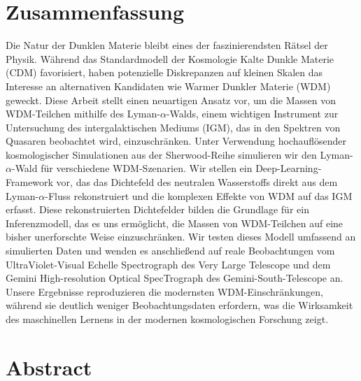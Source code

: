 \documentclass[
     12pt,                    %
     a4paper,             %
     BCOR=10mm,     %
     DIV=14,                 %
     listof=totoc,                    %
     bibliography=totoc,       %
     index=totoc,              %
     twoside,
     headsepline
     ]{scrreprt}
\begin{document}
\cleardoublepage

\section*{Zusammenfassung}

Die Natur der Dunklen Materie bleibt eines der faszinierendsten Rätsel der Physik. Während das Standardmodell der Kosmologie Kalte Dunkle Materie (CDM) favorisiert, haben potenzielle Diskrepanzen auf kleinen Skalen das Interesse an alternativen Kandidaten wie Warmer Dunkler Materie (WDM) geweckt. Diese Arbeit stellt einen neuartigen Ansatz vor, um die Massen von WDM-Teilchen mithilfe des Lyman-$\alpha$-Walds, einem wichtigen Instrument zur Untersuchung des intergalaktischen Mediums (IGM), das in den Spektren von Quasaren beobachtet wird, einzuschränken. Unter Verwendung hochauflösender kosmologischer Simulationen aus der Sherwood-Reihe simulieren wir den Lyman-$\alpha$-Wald für verschiedene WDM-Szenarien. Wir stellen ein Deep-Learning-Framework vor, das das Dichtefeld des neutralen Wasserstoffs direkt aus dem Lyman-$\alpha$-Fluss rekonstruiert und die komplexen Effekte von WDM auf das IGM erfasst. Diese rekonstruierten Dichtefelder bilden die Grundlage für ein Inferenzmodell, das es uns ermöglicht, die Massen von WDM-Teilchen auf eine bisher unerforschte Weise einzuschränken. Wir testen dieses Modell umfassend an simulierten Daten und wenden es anschließend auf reale Beobachtungen vom UltraViolet-Visual Echelle Spectrograph des Very Large Telescope und dem Gemini High-resolution Optical SpecTrograph des Gemini-South-Telescope an. Unsere Ergebnisse reproduzieren die modernsten WDM-Einschränkungen, während sie deutlich weniger Beobachtungsdaten erfordern, was die Wirksamkeit des maschinellen Lernens in der modernen kosmologischen Forschung zeigt.
\section*{Abstract}
\end{document}

